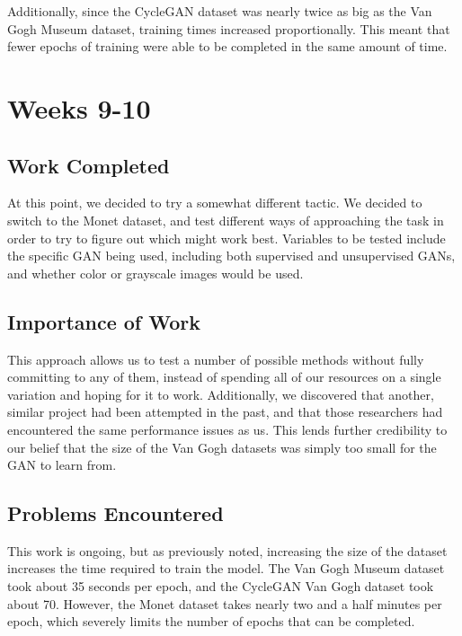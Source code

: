 \documentclass[12pt,letterpaper]{article}
\begin{document}
	Additionally, since the CycleGAN dataset was nearly twice as big as the Van Gogh Museum dataset, training times increased proportionally. This meant that fewer epochs of training were able to be completed in the same amount of time.

	\section{Weeks 9-10}
	\subsection{Work Completed}
	At this point, we decided to try a somewhat different tactic. We decided to switch to the Monet dataset, and test different ways of approaching the task in order to try to figure out which might work best. Variables to be tested include the specific GAN being used, including both supervised and unsupervised GANs, and whether color or grayscale images would be used.
	\subsection{Importance of Work}
	This approach allows us to test a number of possible methods without fully committing to any of them, instead of spending all of our resources on a single variation and hoping for it to work. Additionally, we discovered that another, similar project had been attempted in the past\cite{otherGanGogh}, and that those researchers had encountered the same performance issues as us. This lends further credibility to our belief that the size of the Van Gogh datasets was simply too small for the GAN to learn from.
	\subsection{Problems Encountered}
	This work is ongoing, but as previously noted, increasing the size of the dataset increases the time required to train the model. The Van Gogh Museum dataset took about 35 seconds per epoch, and the CycleGAN Van Gogh dataset took about 70. However, the Monet dataset takes nearly two and a half minutes per epoch, which severely limits the number of epochs that can be completed.


\nocite{*}
\end{document}
